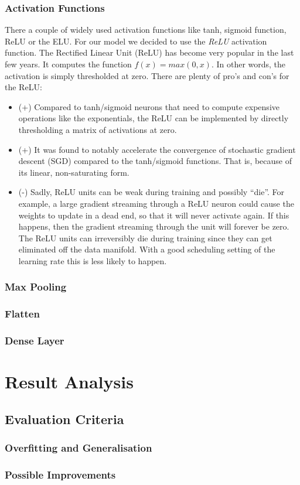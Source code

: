 \documentclass[journal]{IEEEtran}
\begin{document}
\subsubsection{Activation Functions}
There a couple of widely used activation functions like tanh, sigmoid function, ReLU or the ELU. For our model we decided to use the \textit{ReLU} activation function. The Rectified Linear Unit (ReLU) has become very popular in the last few years. It computes the function \(f(x)=max(0,x)\). In other words, the activation is simply thresholded at zero. There are plenty of pro's and con's for the ReLU:
\begin{itemize}
\item (+) Compared to tanh/sigmoid neurons that need to compute expensive operations  like the exponentials, the ReLU can be implemented by directly thresholding a matrix of activations at zero.
\item (+) It was found to notably accelerate the convergence of stochastic gradient descent (SGD) compared to the tanh/sigmoid functions. That is, because of its linear, non-saturating form.
\item (-) Sadly, ReLU units can be weak during training and possibly “die”. For example, a large gradient streaming through a ReLU neuron could cause the weights to update in a dead end, so that it will never activate again. If this happens, then the gradient streaming through the unit will forever be zero. The ReLU units can irreversibly die during training since they can get eliminated off the data manifold. With a good scheduling setting of the learning rate this is less likely to happen.
\end{itemize}


\subsubsection{Max Pooling}
\subsubsection{Flatten}
\subsubsection{Dense Layer}
%
%
\section{Result Analysis}
\subsection{Evaluation Criteria}
\subsubsection{Overfitting and Generalisation}
\subsubsection{Possible Improvements}
\ifCLASSOPTIONcaptionsoff
  \newpage
\fi


\vfill
\end{document}
